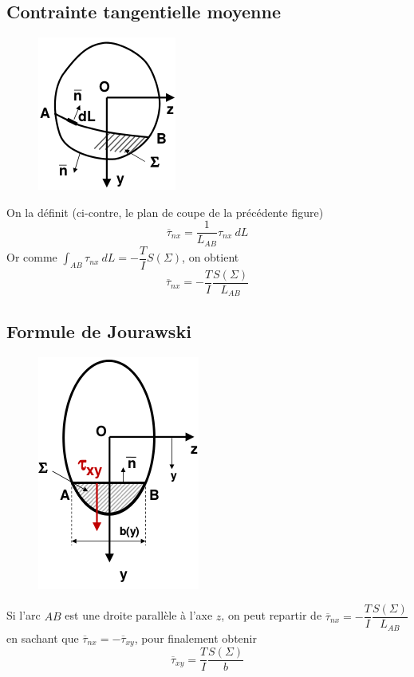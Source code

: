 	\subsection{Contrainte tangentielle moyenne}
	\begin{figure}
	\vspace{-7mm}
	\includegraphics[scale=0.4]{ch5/image4.png}
	\end{figure}
	On la définit (ci-contre, le plan de coupe de la précédente figure)
	\begin{equation}
	\overline{\tau}_{nx} = \dfrac{1}{L_{AB}}\tau_{nx}\ dL
	\end{equation}
	Or comme $\int_{AB} \tau_{nx}\ dL = -\dfrac{T}{I}S(\Sigma)$, on obtient 
	\begin{equation}
	\overline{\tau}_{nx} = -\dfrac{T}{I}\dfrac{S(\Sigma)}{L_{AB}}
	\end{equation}
	
	
	\subsection{Formule de Jourawski}
	\begin{figure}
	\vspace{-7mm}
	\includegraphics[scale=0.4]{ch5/image5.png}
	\end{figure}
	Si l'arc $AB$ est une droite parallèle à l'axe $z$, on peut repartir de 
	$\overline{\tau}_{nx} = -\dfrac{T}{I}\dfrac{S(\Sigma)}{L_{AB}}$ en sachant 
	que $\overline{\tau}_{nx} = -\overline{\tau}_{xy}$, pour finalement obtenir 
	\begin{equation}
	\overline{\tau}_{xy} = \dfrac{T}{I}\dfrac{S(\Sigma)}{b}
	\end{equation}
		
